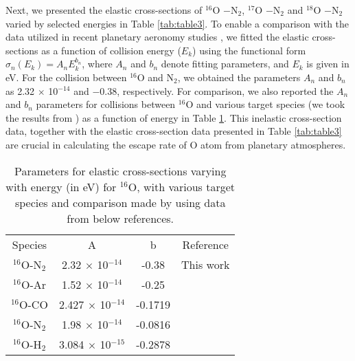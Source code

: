\documentclass[fleqn,usenatbib]{mnras}
\begin{document}
Next, we presented the elastic cross-sections of $^{16}$O $-$N$_2$, $^{17}$O $-$N$_2$ and $^{18}$O $-$N$_2$ varied by selected energies in Table \ref{tab:table3}. To enable a comparison with the data utilized in recent planetary aeronomy studies \citep{fox1993production, LO2021114371,https://doi.org/10.1002/2016JA023461}, we fitted the elastic cross-sections as a function of collision energy ($E_k$) using the functional form $\sigma_n(E_k)=A_n E_k^{b_n}$, where $A_n$ and $b_n$ denote fitting parameters, and $E_k$ is given in eV. For the collision between $^{16}$O and N$_2$, we obtained the parameters $A_n$ and $b_n$ as 2.32 $\times$ 10$^{-14}$ and $-$0.38, respectively. For comparison, we also reported the $A_n$ and $b_n$ parameters for collisions between $^{16}$O and various target species (we took the results from \cite{FOX2018411}) as a function of energy in Table \ref{tab:table4}. This inelastic cross-section data, together with the elastic cross-section data presented in Table \ref{tab:table3} are crucial in calculating the escape rate of O atom from planetary atmospheres.


\begin{table} %
\caption{\label{tab:table4}Parameters for elastic cross-sections varying with energy (in eV) for $^{16}$O, with various target species and comparison made by \citep{FOX2018411} using data from below references.}
\centering
\begin{tabular}{cccc}
\cline{1-4}
    Species     &   A                           &  b        & Reference   \\
$^{16}$O-N$_2$  &   2.32  $\times$ 10$^{-14}$   & -0.38     & This work\\
$^{16}$O-Ar     &   1.52  $\times$ 10$^{-14}$   & -0.25     & \cite{doi:10.1063/1.1637343}\\ 
$^{16}$O-CO     &   2.427 $\times$ 10$^{-14}$   & -0.1719   & \cite{chhabra2023quantum}\\ 
$^{16}$O-N$_2$  &   1.98  $\times$ 10$^{-14}$   & -0.0816   & \cite{https://doi.org/10.1029/98JA02198}\\  
$^{16}$O-H$_2$  &   3.084 $\times$ 10$^{-15}$   & -0.2878   & \cite{https://doi.org/10.1029/2012GL050904}\\ 
\cline{1-4}          
\end{tabular}
\end{table}
\end{document}
